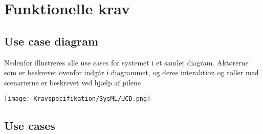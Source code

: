 \chapter{Funktionelle krav}

\section{Use case diagram}
Nedenfor illustreres alle use cases for systemet i et samlet diagram. Aktørerne som er beskrevet ovenfor indgår i diagrammet, og deres interaktion og roller med scenarierne er beskrevet ved hjælp af pilene
\begin{center}
	\texttt{[image: Kravspecifikation/SysML/UCD.png]}
\end{center}



\newpage

\section{Use cases}
	
	
	
	
	
	
	
	
	
	
	
	
	
	
	
